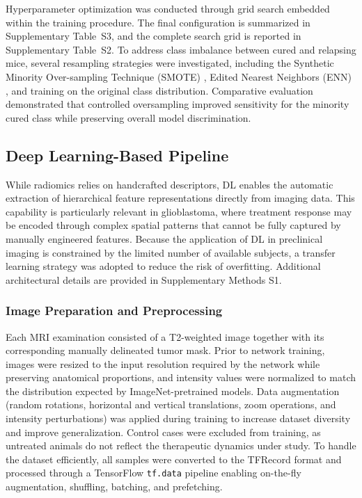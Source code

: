 \documentclass{article}
\begin{document}
Hyperparameter optimization was conducted through grid search embedded within the training procedure. The final configuration is summarized in Supplementary Table~S3, and the complete search grid is reported in Supplementary Table~S2. To address class imbalance between cured and relapsing mice, several resampling strategies were investigated, including the Synthetic Minority Over-sampling Technique (SMOTE) \cite{Chawla2002}, Edited Nearest Neighbors (ENN) \cite{Wilson1972}, and training on the original class distribution. Comparative evaluation demonstrated that controlled oversampling improved sensitivity for the minority cured class while preserving overall model discrimination.


\subsection{Deep Learning-Based Pipeline}

While radiomics relies on handcrafted descriptors, DL enables the automatic extraction of hierarchical feature representations directly from imaging data. This capability is particularly relevant in glioblastoma, where treatment response may be encoded through complex spatial patterns that cannot be fully captured by manually engineered features. Because the application of DL in preclinical imaging is constrained by the limited number of available subjects, a transfer learning strategy was adopted to reduce the risk of overfitting. Additional architectural details are provided in Supplementary Methods S1.

\subsubsection{Image Preparation and Preprocessing}

Each MRI examination consisted of a T2-weighted image together with its corresponding manually delineated tumor mask. Prior to network training, images were resized to the input resolution required by the network while preserving anatomical proportions, and intensity values were normalized to match the distribution expected by ImageNet-pretrained models. Data augmentation (random rotations, horizontal and vertical translations, zoom operations, and intensity perturbations) was applied during training to increase dataset diversity and improve generalization. Control cases were excluded from training, as untreated animals do not reflect the therapeutic dynamics under study. To handle the dataset efficiently, all samples were converted to the TFRecord format and processed through a TensorFlow \texttt{tf.data} pipeline enabling on-the-fly augmentation, shuffling, batching, and prefetching.
\end{document}
